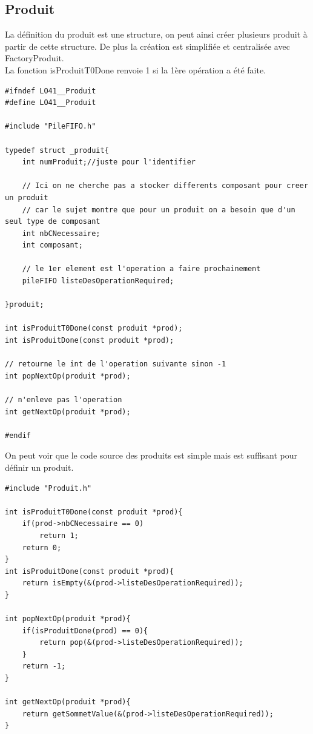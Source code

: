 \documentclass{report}
\begin{document}
\subsection{Produit}
La définition du produit est une structure, on peut ainsi créer plusieurs produit à partir de cette structure. De plus la création est simplifiée et centralisée avec FactoryProduit.\\
La fonction isProduitT0Done renvoie 1 si la 1ère opération a été faite.
\begin{lstlisting}[caption=Représentation des produits]
#ifndef LO41__Produit
#define LO41__Produit

#include "PileFIFO.h"

typedef struct _produit{
    int numProduit;//juste pour l'identifier
    
    // Ici on ne cherche pas a stocker differents composant pour creer un produit
    // car le sujet montre que pour un produit on a besoin que d'un seul type de composant
    int nbCNecessaire;
    int composant;
    
    // le 1er element est l'operation a faire prochainement
    pileFIFO listeDesOperationRequired;
    
}produit;

int isProduitT0Done(const produit *prod);
int isProduitDone(const produit *prod);

// retourne le int de l'operation suivante sinon -1
int popNextOp(produit *prod);

// n'enleve pas l'operation
int getNextOp(produit *prod);

#endif
\end{lstlisting}

On peut voir que le code source des produits est simple mais est suffisant pour définir un produit.
\begin{lstlisting}[caption=Code source des produits]
#include "Produit.h"

int isProduitT0Done(const produit *prod){
    if(prod->nbCNecessaire == 0)
        return 1;
    return 0;
}
int isProduitDone(const produit *prod){
    return isEmpty(&(prod->listeDesOperationRequired));
}

int popNextOp(produit *prod){
    if(isProduitDone(prod) == 0){
        return pop(&(prod->listeDesOperationRequired));
    }
    return -1;
}

int getNextOp(produit *prod){
    return getSommetValue(&(prod->listeDesOperationRequired));
}
\end{lstlisting}
\end{document}
